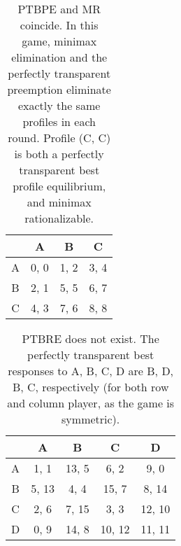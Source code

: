 \begin{table}
	\caption{
		PTBPE and MR coincide.
		In this game, minimax elimination and the perfectly transparent preemption eliminate exactly the same profiles in each round.
		Profile (C, C) is both a perfectly transparent best profile equilibrium, and minimax rationalizable.
	}
	\label{tab:ptbpe-eq-minimax}
	\centering
	\begin{tabular}{|c|c|c|c|}
		\hline
			& A		& B	   & C	  \\
		\hline
		A 		&\cellcolor{gray!70} 0, 0 &\cellcolor{gray!70} 1, 2 &\cellcolor{gray!70} 3, 4 \\
		\hline
		B		&\cellcolor{gray!70} 2, 1 &\cellcolor{gray!20} 5, 5 &\cellcolor{gray!20} 6, 7 \\
		\hline
		C		&\cellcolor{gray!70} 4, 3 &\cellcolor{gray!20} 7, 6 &\cellcolor{gray!00} 8, 8 \\
		\hline
	\end{tabular}
\end{table}


\begin{table}
	\caption{
		PTBRE does not exist.
		The perfectly transparent best responses to A, B, C, D are B, D, B, C, respectively (for both row and column player, as the game is symmetric).
	}
	\label{tab:no-ptbre}
	\centering
	\begin{tabular}{|c|c|c|c|c|}
		\hline
			& A		& B	   & C	 & D	 \\
		\hline
		A 		&\cellcolor{gray!70}  1,  1 &\cellcolor{gray!20} 13,  5 &\cellcolor{gray!70}  6,  2 &\cellcolor{gray!70}  9,  0 \\
		\hline
		B		&\cellcolor{gray!20}  5, 13 &\cellcolor{gray!20}  4,  4 &\cellcolor{gray!20} 15,  7 &\cellcolor{gray!20}  8, 14 \\
		\hline
		C		&\cellcolor{gray!70}  2,  6 &\cellcolor{gray!20}  7, 15 &\cellcolor{gray!70}  3,  3 &\cellcolor{gray!20} 12, 10 \\
		\hline
		D		&\cellcolor{gray!70}  0,  9 &\cellcolor{gray!20} 14,  8 &\cellcolor{gray!20} 10, 12 &\cellcolor{gray!20} 11, 11 \\
		\hline
	\end{tabular}
\end{table}


